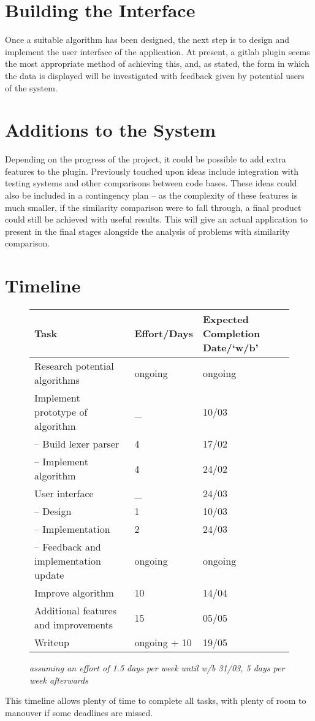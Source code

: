 \section{Building the Interface}

Once a suitable algorithm has been designed, the next step is to design and 
implement the user interface of the application. At present, a gitlab plugin
seems the most appropriate method of achieving this, and, as stated, the
form in which the data is displayed will be investigated with feedback given by
potential users of the system.

\section{Additions to the System}

Depending on the progress of the project, it could be possible to add extra
features to the plugin. Previously touched upon ideas include integration with
testing systems and other comparisons between code bases. These ideas could also
be included in a contingency plan -- as the complexity of these features is much
smaller, if the similarity comparison were to fall through, a final product could
still be achieved with useful results. This will give an actual application to
present in the final stages alongside the analysis of problems with similarity
comparison.

\section{Timeline}
\begin{figure}[ht!]
\centering
\begin{tabular}{ | l | l | l| }
    	\hline
    	\textbf{Task} & \textbf{Effort/Days} & \textbf{Expected Completion Date/`w/b'} \\ \hline
    	\hline
    	Research potential algorithms & ongoing & ongoing \\ \hline
    	Implement prototype of algorithm & \_ & 10/03 \\ \hline
    	-- Build lexer parser & 4 & 17/02 \\ \hline
    	-- Implement algorithm & 4 & 24/02 \\ \hline
    	User interface & \_ & 24/03 \\ \hline
    	-- Design & 1 & 10/03 \\ \hline
    	-- Implementation & 2 & 24/03 \\ \hline
    	-- Feedback and implementation update & ongoing & ongoing \\ \hline
    	Improve algorithm & 10 & 14/04 \\ \hline
    	Additional features and improvements & 15 & 05/05 \\ \hline
    	Writeup & ongoing + 10 & 19/05 \\ \hline
\end{tabular}
\emph{assuming an effort of 1.5 days per week until w/b 31/03, 5 days per week afterwards}		
\end{figure}

This timeline allows plenty of time to complete all tasks, with plenty of room to
manouver if some deadlines are missed.